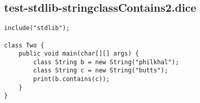 \subsection{test-stdlib-stringclassContains2.dice}
\begin{verbatim}
include("stdlib");

class Two {
	public void main(char[][] args) {
        class String b = new String("philkhal");
        class String c = new String("butts");
        print(b.contains(c));
	}
}

\end{verbatim}